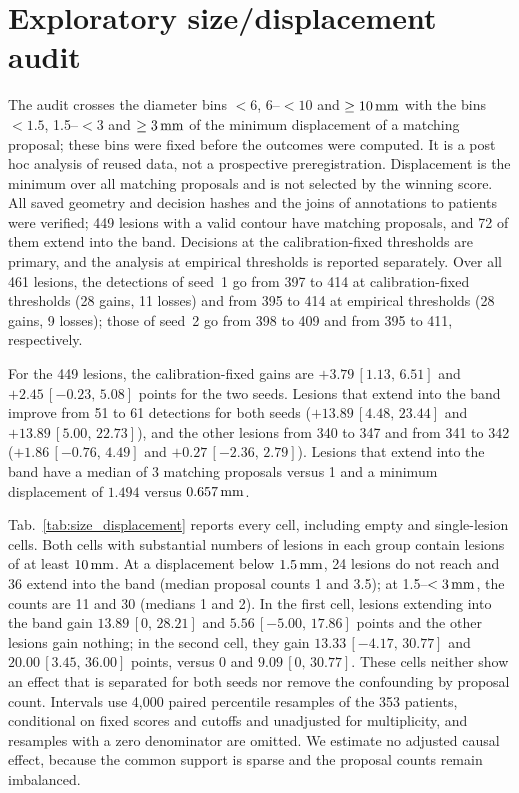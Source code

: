 \section{Exploratory size/displacement audit}
\label{supp:sizeaudit}

The audit crosses the diameter bins $<6$, 6--$<10$ and $\ge10\,\mathrm{mm}$ with the bins $<1.5$, 1.5--$<3$ and $\ge3\,\mathrm{mm}$ of the minimum displacement of a matching proposal; these bins were fixed before the outcomes were computed. It is a post hoc analysis of reused data, not a prospective preregistration. Displacement is the minimum over all matching proposals and is not selected by the winning score. All saved geometry and decision hashes and the joins of annotations to patients were verified; 449 lesions with a valid contour have matching proposals, and 72 of them extend into the band. Decisions at the calibration-fixed thresholds are primary, and the analysis at empirical thresholds is reported separately. Over all 461 lesions, the detections of seed~1 go from 397 to 414 at calibration-fixed thresholds (28 gains, 11 losses) and from 395 to 414 at empirical thresholds (28 gains, 9 losses); those of seed~2 go from 398 to 409 and from 395 to 411, respectively.

For the 449 lesions, the calibration-fixed gains are $+3.79\,[1.13,\,6.51]$ and $+2.45\,[-0.23,\,5.08]$ points for the two seeds. Lesions that extend into the band improve from 51 to 61 detections for both seeds ($+13.89\,[4.48,\,23.44]$ and $+13.89\,[5.00,\,22.73]$), and the other lesions from 340 to 347 and from 341 to 342 ($+1.86\,[-0.76,\,4.49]$ and $+0.27\,[-2.36,\,2.79]$). Lesions that extend into the band have a median of 3 matching proposals versus 1 and a minimum displacement of $1.494$ versus $0.657\,\mathrm{mm}$.

Tab.~\ref{tab:size_displacement} reports every cell, including empty and single-lesion cells. Both cells with substantial numbers of lesions in each group contain lesions of at least $10\,\mathrm{mm}$. At a displacement below $1.5\,\mathrm{mm}$, 24 lesions do not reach and 36 extend into the band (median proposal counts 1 and 3.5); at 1.5--$<3\,\mathrm{mm}$, the counts are 11 and 30 (medians 1 and 2). In the first cell, lesions extending into the band gain $13.89\,[0,\,28.21]$ and $5.56\,[-5.00,\,17.86]$ points and the other lesions gain nothing; in the second cell, they gain $13.33\,[-4.17,\,30.77]$ and $20.00\,[3.45,\,36.00]$ points, versus 0 and $9.09\,[0,\,30.77]$. These cells neither show an effect that is separated for both seeds nor remove the confounding by proposal count. Intervals use 4,000 paired percentile resamples of the 353 patients, conditional on fixed scores and cutoffs and unadjusted for multiplicity, and resamples with a zero denominator are omitted. We estimate no adjusted causal effect, because the common support is sparse and the proposal counts remain imbalanced.

